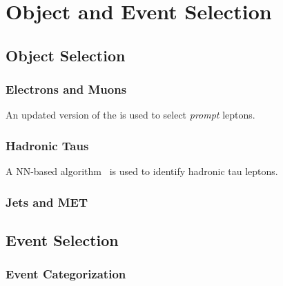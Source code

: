 \chapter{Object and Event Selection}
\label{chap:ObjEvt}

\section{Object Selection}
\label{sec:Obj}

\subsection{Electrons and Muons}
\label{subsec:EandM}

An updated version of the \TOP\cite{CMS:2023ftu} is used to select \emph{prompt} leptons.
\subsection{Hadronic Taus}
\label{subsec:Taus}

A \ac{NN}-based algorithm~\cite{CMS:2022prd} is used to identify hadronic tau leptons.
\subsection{Jets and MET}
\label{subsec:JME}


\section{Event Selection}
\label{sec:Evt}

\subsection{Event Categorization}
\label{subsec:Cat}

